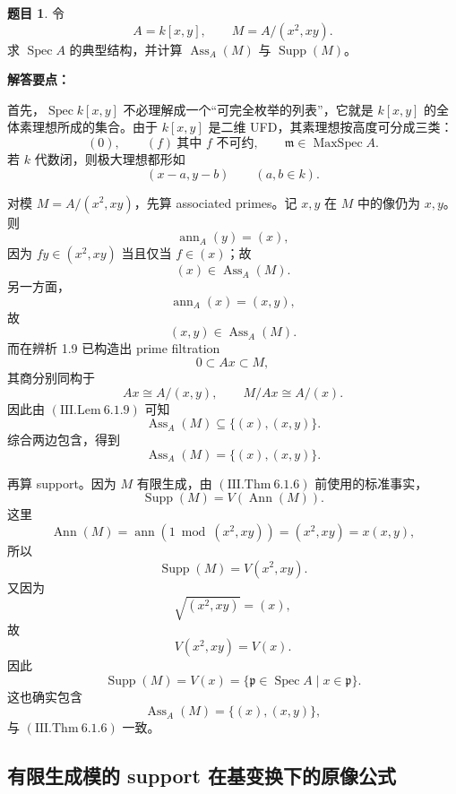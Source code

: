 \documentclass[a4paper]{ctexart}
\theoremstyle{definition}
\newtheorem{example}{题目}[section]
\theoremstyle{analysis}
\theoremstyle{plain}
\begin{document}
\begin{example}
令
\[
  A=k[x,y],\qquad M=A/(x^2,xy).
\]
求 \(\operatorname{Spec}A\) 的典型结构，并计算 \(\operatorname{Ass}_A(M)\) 与 \(\operatorname{Supp}(M)\)。

\textbf{解答要点：}

首先，\(\operatorname{Spec}k[x,y]\) 不必理解成一个“可完全枚举的列表”，它就是 \(k[x,y]\) 的全体素理想所成的集合。由于 \(k[x,y]\) 是二维 UFD，其素理想按高度可分成三类：
\[
  (0),\qquad (f)\ \text{其中 }f\text{ 不可约},\qquad \mathfrak m\in \operatorname{MaxSpec}A.
\]
若 \(k\) 代数闭，则极大理想都形如
\[
  (x-a,y-b)\qquad (a,b\in k).
\]

对模 \(M=A/(x^2,xy)\)，先算 associated primes。记 \(x,y\) 在 \(M\) 中的像仍为 \(x,y\)。则
\[
  \operatorname{ann}_A(y)=(x),
\]
因为 \(fy\in (x^2,xy)\) 当且仅当 \(f\in (x)\)；故
\[
  (x)\in \operatorname{Ass}_A(M).
\]
另一方面，
\[
  \operatorname{ann}_A(x)=(x,y),
\]
故
\[
  (x,y)\in \operatorname{Ass}_A(M).
\]
而在辨析 1.9 已构造出 prime filtration
\[
  0\subset Ax\subset M,
\]
其商分别同构于
\[
  Ax\cong A/(x,y),\qquad M/Ax\cong A/(x).
\]
因此由 \((\mathrm{III.Lem}\ 6.1.9)\) 可知
\[
  \operatorname{Ass}_A(M)\subseteq \{(x),(x,y)\}.
\]
综合两边包含，得到
\[
  \operatorname{Ass}_A(M)=\{(x),(x,y)\}.
\]

再算 support。因为 \(M\) 有限生成，由 \((\mathrm{III.Thm}\ 6.1.6)\) 前使用的标准事实，
\[
  \operatorname{Supp}(M)=V(\operatorname{Ann}(M)).
\]
这里
\[
  \operatorname{Ann}(M)=\operatorname{ann}(1\bmod (x^2,xy))=(x^2,xy)=x(x,y),
\]
所以
\[
  \operatorname{Supp}(M)=V(x^2,xy).
\]
又因为
\[
  \sqrt{(x^2,xy)}=(x),
\]
故
\[
  V(x^2,xy)=V(x).
\]
因此
\[
  \operatorname{Supp}(M)=V(x)=\{\mathfrak p\in \operatorname{Spec}A\mid x\in \mathfrak p\}.
\]
这也确实包含
\[
  \operatorname{Ass}_A(M)=\{(x),(x,y)\},
\]
与 \((\mathrm{III.Thm}\ 6.1.6)\) 一致。
\end{example}

\subsection{\texorpdfstring{有限生成模的 support 在基变换下的原像公式}{有限生成模的 support 在基变换下的原像公式}}\label{subsec:problem-support-base-change}
\end{document}
